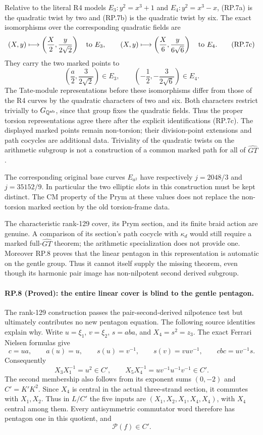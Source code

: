 Relative to the literal R4 models
$E_3:y^2=x^3+1$ and $E_4:y^2=x^3-x$,
(RP.7a) is the quadratic twist by two and
(RP.7b) is the quadratic twist by six.
The exact isomorphisms over the corresponding
quadratic fields are
\[
 (X,y)\longmapsto\left(\frac X2,
                            \frac y{2\sqrt2}\right)
          \quad\hbox{to }E_3,
 \qquad
 (X,y)\longmapsto\left(\frac X6,
                            \frac y{6\sqrt6}\right)
          \quad\hbox{to }E_4.
 \tag{RP.7c}
\]
They carry the two marked points to
\[
 \left(\frac a2,\frac3{2\sqrt2}\right)\in E_3,
 \qquad
 \left(-\frac12,-\frac3{2\sqrt6}\right)\in E_4.
\]
The Tate-module representations before these
isomorphisms differ from those of the R4
curves by the quadratic characters of two
and six. Both characters restrict trivially
to $G_{\mathbb Q^{\rm ab}}$, since that group
fixes the quadratic fields. Thus the proper
torsion representations agree there after
the explicit identifications (RP.7c).
The displayed marked points remain
non-torsion; their division-point extensions
and path cocycles are additional data.
Triviality of the quadratic twists on the
arithmetic subgroup is not a construction
of a common marked path for all of
$\widehat{GT}$.

The corresponding original base curves
$E_{a^2}$ have respectively $j=2048/3$ and
$j=35152/9$. In particular the two elliptic
slots in this construction must be kept
distinct. The CM property of the Prym at
these values does not replace the non-torsion
marked section by the old torsion-frame data.

The characteristic rank-129 cover, its
Prym section, and its finite braid action
are genuine. A comparison of its section's
path cocycle with $\kappa_d$ would still
require a marked full-$\widehat{GT}$ theorem;
the arithmetic specialization does not
provide one. Moreover RP.8 proves that
the linear pentagon in this representation
is automatic on the gentle group. Thus
it cannot itself supply the missing theorem,
even though its harmonic pair image has
non-nilpotent second derived subgroup.

\paragraph{RP.8 (Proved): the entire linear cover is blind to the gentle pentagon.}
The rank-129 construction passes the pair-second-derived
nilpotence test but ultimately contributes no new pentagon
equation. The following source identities explain why.
Write $u=\xi_1$, $v=\xi_2$, $s=aba$, and
$X_4=s^2=z_3$. The exact Ferrari Nielsen formulas give
\[
 c=ua,\qquad a(u)=u,\qquad
 s(u)=v^{-1},\qquad s(v)=vuv^{-1},\qquad
 cbc=uv^{-1}s.
\]
Consequently
\[
 X_3X_1^{-1}=u^2\in C',\qquad
 X_5X_4^{-1}=uv^{-1}u^{-1}v^{-1}\in C'.
 \tag{RP.8a}
\]
The second membership also follows from its exponent sums
$(0,-2)$ and $C'=K'K^2$. Since $X_4$ is central in
the actual three-strand section, it commutes with
$X_1,X_2$. Thus in $L/C'$ the five inputs are
$(X_1,X_2,X_1,X_4,X_4)$, with $X_4$ central among
them. Every antisymmetric commutator word therefore
has pentagon one in this quotient, and
\[
                         \mathcal P(f)\in C'.
 \tag{RP.8b}
\]

